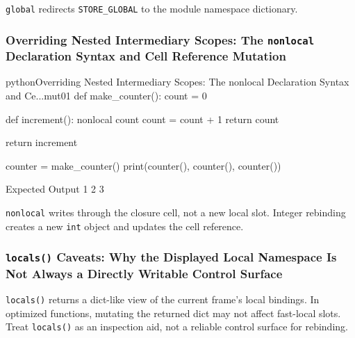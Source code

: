 \texttt{global} redirects \texttt{STORE\_GLOBAL} to the module namespace dictionary.

\subsubsection{Overriding Nested Intermediary Scopes: The \texttt{nonlocal} Declaration Syntax and Cell Reference Mutation}

\begin{codebox}[]{python}{Overriding Nested Intermediary Scopes: The nonlocal Declaration Syntax and Ce...}{mut01}
def make_counter():
    count = 0

    def increment():
        nonlocal count
        count = count + 1
        return count

    return increment

counter = make_counter()
print(counter(), counter(), counter())
\end{codebox}


\begin{iobox}{Expected Output}
1 2 3 \\
\end{iobox}




\texttt{nonlocal} writes through the closure cell, not a new local slot. Integer rebinding creates a new \texttt{int} object and updates the cell reference.

\subsubsection{\texttt{locals()} Caveats: Why the Displayed Local Namespace Is Not Always a Directly Writable Control Surface}

\texttt{locals()} returns a dict-like view of the current frame's local bindings. In optimized functions, mutating the returned dict may not affect fast-local slots. Treat \texttt{locals()} as an inspection aid, not a reliable control surface for rebinding.
